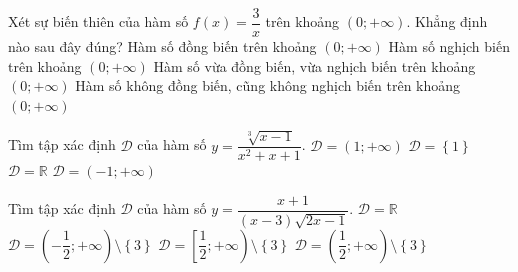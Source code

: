 \begin{ex}
\begin{ex}%
    Xét sự biến thiên của hàm số $f(x)=\dfrac{3}{x}$ trên khoảng $(0;+\infty)$. Khẳng định nào sau đây đúng?
    \choice
    {Hàm số đồng biến trên khoảng $\left(0;+\infty \right)$}
    {\True Hàm số nghịch biến trên khoảng $\left(0;+\infty \right)$}
    {Hàm số vừa đồng biến, vừa nghịch biến trên khoảng $\left(0;+\infty \right)$}
    {Hàm số không đồng biến, cũng không nghịch biến trên khoảng $\left(0;+\infty \right)$}
\end{ex}

\begin{ex}%
    Tìm tập xác định $\mathscr{D}$ của hàm số $y=\dfrac{\sqrt[3]{x-1}}{x^2+x+1}$.
    \choice
    {$\mathscr{D}=\left(1;+\infty \right)$}
    {$\mathscr{D}=\left\{1\right\}$}
    {\True $\mathscr{D}=\mathbb{R}$}
    {$\mathscr{D}=\left(-1;+\infty \right)$}
\end{ex}

\begin{ex}%
    Tìm tập xác định $\mathscr{D}$ của hàm số $y=\dfrac{x+1}{(x-3)\sqrt{2x-1}}$.
    \choice
    {$\mathscr{D}=\mathbb{R}$}
    {$\mathscr{D}=\left(-\dfrac{1}{2};+\infty \right)\setminus\left\{3\right\}$}
    {$\mathscr{D}=\left[\dfrac{1}{2};+\infty \right)\setminus\left\{3\right\}$}
    {\True $\mathscr{D}=\left(\dfrac{1}{2};+\infty \right)\setminus\left\{3\right\}$}
\end{ex}


\end{ex}
